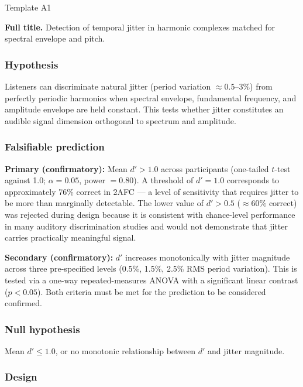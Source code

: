 \documentclass[11pt, a4paper]{article}
\begin{document}
\begin{predbox}{Template A1}

\textbf{Full title.}
Detection of temporal jitter in harmonic complexes matched for spectral envelope and pitch.

\subsubsection{Hypothesis}

Listeners can discriminate natural jitter (period variation $\approx 0.5$–$3\%$)
from perfectly periodic harmonics when spectral envelope, fundamental frequency,
and amplitude envelope are held constant.  This tests whether jitter constitutes
an audible signal dimension orthogonal to spectrum and amplitude.

\subsubsection{Falsifiable prediction}

\textbf{Primary (confirmatory):} Mean $d' > 1.0$ across participants (one-tailed
$t$-test against 1.0; $\alpha = 0.05$, power $= 0.80$).  A threshold of $d' = 1.0$
corresponds to approximately 76\% correct in 2AFC — a level of sensitivity that
requires jitter to be more than marginally detectable.  The lower value of
$d' > 0.5$ ($\approx 60\%$ correct) was rejected during design because it is
consistent with chance-level performance in many auditory discrimination studies
and would not demonstrate that jitter carries practically meaningful signal.

\textbf{Secondary (confirmatory):} $d'$ increases monotonically with jitter
magnitude across three pre-specified levels (0.5\%, 1.5\%, 2.5\% RMS period
variation).  This is tested via a one-way repeated-measures ANOVA with a
significant linear contrast ($p < 0.05$).  Both criteria must be met for the
prediction to be considered confirmed.

\subsubsection{Null hypothesis}

Mean $d' \leq 1.0$, or no monotonic relationship between $d'$ and jitter magnitude.

\subsubsection{Design}


\end{predbox}
\end{document}
